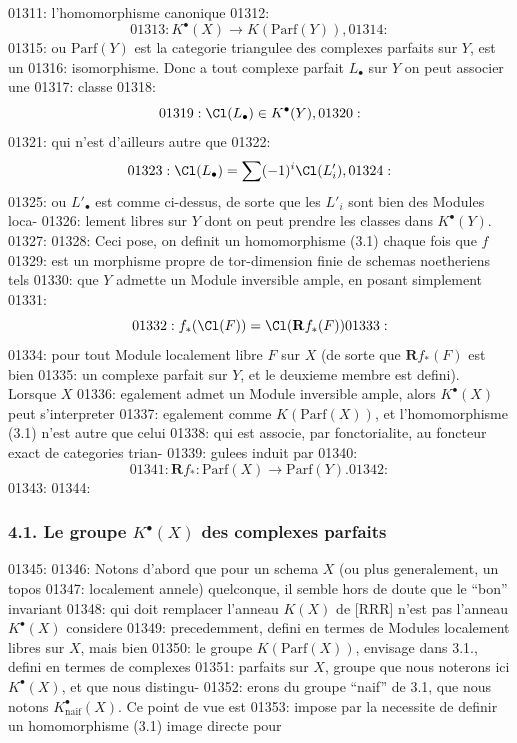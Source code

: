 01311: l'homomorphisme canonique
01312: \[
01313: K^{\bullet}(X) \longrightarrow K(\mathrm{Parf}(Y)),
01314: \]
01315: ou $\mathrm{Parf}(Y)$ est la categorie triangulee des complexes parfaits sur $Y$, est un
01316: isomorphisme. Donc a tout complexe parfait $L_{\bullet}$ sur $Y$ on peut associer une
01317: classe
01318: \[
01319: \Cl(L_{\bullet}) \in K^{\bullet}(Y),
01320: \]
01321: qui n'est d'ailleurs autre que
01322: \[
01323: \Cl(L_{\bullet}) = \sum (-1)^i \Cl(L'_i),
01324: \]
01325: ou $L'_{\bullet}$ est comme ci-dessus, de sorte que les $L'_i$ sont bien des Modules loca-
01326: lement libres sur $Y$ dont on peut prendre les classes dans $K^{\bullet}(Y)$.
01327: 
01328: Ceci pose, on definit un homomorphisme (3.1) chaque fois que $f$
01329: est un morphisme propre de tor-dimension finie de schemas noetheriens tels
01330: que $Y$ admette un Module inversible ample, en posant simplement
01331: \begin{equation}
01332: f_{*}(\Cl(F)) = \Cl(\mathbf{R}f_{*}(F))
01333: \end{equation}
01334: pour tout Module localement libre $F$ sur $X$ (de sorte que $\mathbf{R}f_{*}(F)$ est bien
01335: un complexe parfait sur $Y$, et le deuxieme membre est defini). Lorsque $X$
01336: egalement admet un Module inversible ample, alors $K^{\bullet}(X)$ peut s'interpreter
01337: egalement comme $K(\mathrm{Parf}(X))$, et l'homomorphisme (3.1) n'est autre que celui
01338: qui est associe, par fonctorialite, au foncteur exact de categories trian-
01339: gulees induit par
01340: \[
01341: \mathbf{R}f_{*}: \mathrm{Parf}(X) \longrightarrow \mathrm{Parf}(Y).
01342: \]
01343: 
01344: \subsubsection*{4.1. Le groupe $K^{\bullet}(X)$ des complexes parfaits}
01345: 
01346: Notons d'abord que pour un schema $X$ (ou plus generalement, un topos
01347: localement annele) quelconque, il semble hors de doute que le ``bon'' invariant
01348: qui doit remplacer l'anneau $K(X)$ de [RRR] n'est pas l'anneau $K^{\bullet}(X)$ considere
01349: precedemment, defini en termes de Modules localement libres sur $X$, mais bien
01350: le groupe $K(\mathrm{Parf}(X))$, envisage dans 3.1., defini en termes de complexes
01351: parfaits sur $X$, groupe que nous noterons ici $K^{\bullet}(X)$, et que nous distingu-
01352: erons du groupe ``naif'' de 3.1, que nous notons $K^{\bullet}_{\text{naif}}(X)$. Ce point de vue est
01353: impose par la necessite de definir un homomorphisme (3.1) image directe pour
